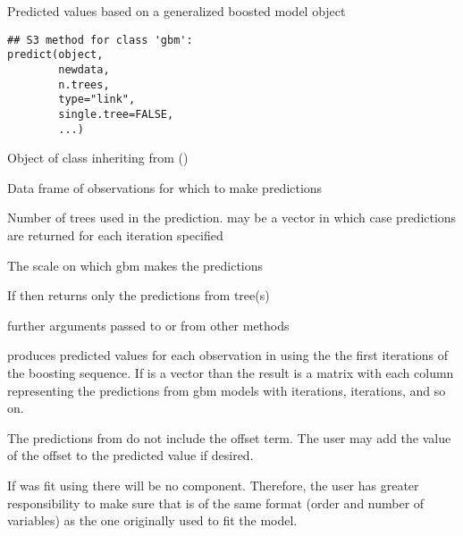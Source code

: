 \documentclass{article}
\begin{document}
\begin{Description}\relax
Predicted values based on a generalized boosted model object
\end{Description}
\begin{Usage}
\begin{verbatim}
## S3 method for class 'gbm':
predict(object,
        newdata,
        n.trees,
        type="link",
        single.tree=FALSE,
        ...)
\end{verbatim}
\end{Usage}
\begin{Arguments}
\begin{ldescription}
\item[\code{object}] Object of class inheriting from () 
\item[\code{newdata}] Data frame of observations for which to make predictions 
\item[\code{n.trees}] Number of trees used in the prediction.  may
be a vector in which case predictions are returned for each
iteration specified
\item[\code{type}] The scale on which gbm makes the predictions 
\item[\code{single.tree}] If  then  returns
only the predictions from tree(s) 
\item[\code{...}] further arguments passed to or from other methods 
\end{ldescription}
\end{Arguments}
\begin{Details}\relax
{} produces predicted values for each observation in  using the the first  iterations of the boosting sequence. If  is a vector than the result is a matrix with each column representing the predictions from gbm models with  iterations,  iterations, and so on.

The predictions from  do not include the offset term. The user may add the value of the offset to the predicted value if desired.

If  was fit using  there will be no
 component. Therefore, the user has greater responsibility to make
sure that  is of the same format (order and number of variables)
as the one originally used to fit the model.
\end{Details}
\end{document}
